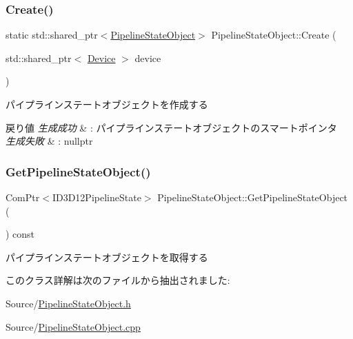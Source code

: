 \subsubsection{\texorpdfstring{Create()}{Create()}}
{\footnotesize\ttfamily static std\+::shared\+\_\+ptr$<$\mbox{\hyperlink{class_pipeline_state_object}{Pipeline\+State\+Object}}$>$ Pipeline\+State\+Object\+::\+Create (\begin{DoxyParamCaption}\item[{std\+::shared\+\_\+ptr$<$ \mbox{\hyperlink{class_device}{Device}} $>$}]{device }\end{DoxyParamCaption})\hspace{0.3cm}{\ttfamily [static]}}



パイプラインステートオブジェクトを作成する 


\begin{DoxyRetVals}{戻り値}
{\em 生成成功} & \+: パイプラインステートオブジェクトのスマートポインタ \\
\hline
{\em 生成失敗} & \+: nullptr \\
\hline
\end{DoxyRetVals}
\mbox{\label{class_pipeline_state_object_a82794a793dde36220e8cbe54f6620db6}} 
\subsubsection{\texorpdfstring{Get\+Pipeline\+State\+Object()}{GetPipelineStateObject()}}
{\footnotesize\ttfamily Com\+Ptr$<$I\+D3\+D12\+Pipeline\+State$>$ Pipeline\+State\+Object\+::\+Get\+Pipeline\+State\+Object (\begin{DoxyParamCaption}{ }\end{DoxyParamCaption}) const}



パイプラインステートオブジェクトを取得する 



このクラス詳解は次のファイルから抽出されました\+:\begin{DoxyCompactItemize}
\item 
Source/\mbox{\hyperlink{_pipeline_state_object_8h}{Pipeline\+State\+Object.\+h}}\item 
Source/\mbox{\hyperlink{_pipeline_state_object_8cpp}{Pipeline\+State\+Object.\+cpp}}\end{DoxyCompactItemize}
